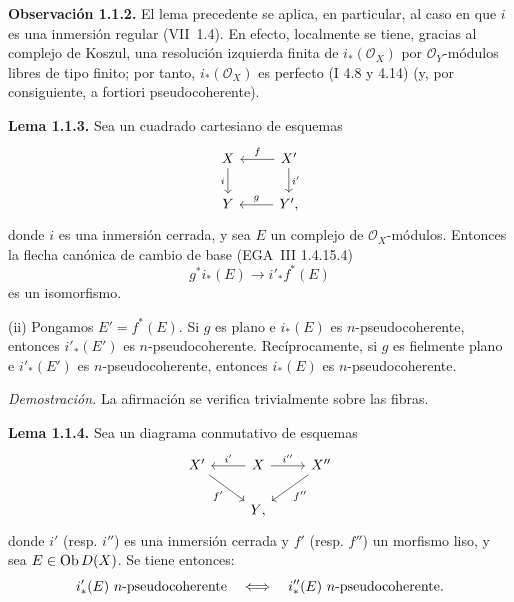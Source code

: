 \textbf{Observación 1.1.2.} El lema precedente se aplica, en particular, al caso en que \(i\) es una inmersión regular (VII~1.4). En efecto, localmente se tiene, gracias al complejo de Koszul, una resolución izquierda finita de \(i_*(\mathcal O_X)\) por \(\mathcal O_Y\)-módulos libres de tipo finito; por tanto, \(i_*(\mathcal O_X)\) es perfecto (I 4.8 y 4.14) (y, por consiguiente, a fortiori pseudocoherente).

\textbf{Lema 1.1.3.} Sea un cuadrado cartesiano de esquemas
\[
\begin{tikzcd}
X \arrow[d,"i"'] & X' \arrow[l,"f"'] \arrow[d,"i'"]\\
Y & Y'{,} \arrow[l,"g"']
\end{tikzcd}
\]
donde \(i\) es una inmersión cerrada, y sea \(E\) un complejo de \(\mathcal O_X\)-módulos. Entonces la flecha canónica de cambio de base (EGA~III 1.4.15.4)
\[
 g^*i_*(E)\longrightarrow i'_*f^*(E)
\]
es un isomorfismo.

(ii) Pongamos \(E'=f^*(E)\). Si \(g\) es plano e \(i_*(E)\) es \(n\)-pseudocoherente, entonces \(i'_*(E')\) es \(n\)-pseudocoherente. Recíprocamente, si \(g\) es fielmente plano e \(i'_*(E')\) es \(n\)-pseudocoherente, entonces \(i_*(E)\) es \(n\)-pseudocoherente.

\emph{Demostración.} La afirmación se verifica trivialmente sobre las fibras.

\textbf{Lema 1.1.4.} Sea un diagrama conmutativo de esquemas
\[
\begin{tikzcd}
X' \arrow[dr,"f'"'] & X \arrow[l,"i'"'] \arrow[r,"i''"] & X'' \arrow[dl,"f''"]\\
& Y{,} &
\end{tikzcd}
\]
donde \(i'\) (resp. \(i''\)) es una inmersión cerrada y \(f'\) (resp. \(f''\)) un morfismo liso, y sea \(E\in\operatorname{Ob} D(X)\). Se tiene entonces:
\[
 i'_*(E)\ n\text{-pseudocoherente}
 \quad\Longleftrightarrow\quad
 i''_*\sisi{}{(E)}\ n\text{-pseudocoherente}.
\]
